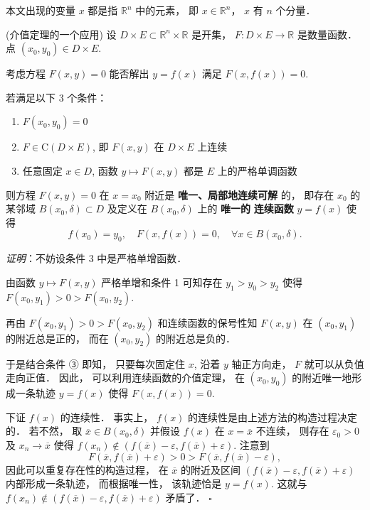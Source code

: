 

本文出现的变量 $x$ 都是指 $\mathbb{R}^n$ 中的元素， 即 $x\in\mathbb{R}^n$， $x$ 有 $n$ 个分量．

\begin{theorem}{(介值定理的一个应用)}\label{impli_the1}
设 $D\times E\subset\mathbb{R}^{n}\times\mathbb{R}$ 是开集，
$F:D\times E\rightarrow\mathbb{R}$ 是数量函数． 点 $(x_{0},y_{0})\in D\times E.$ 

考虑方程 $F(x,y)=0$ 能否解出 $y=f(x)$ 满足 $F(x,f(x))=0.$ 

若满足以下 3 个条件：

\begin{enumerate}
\item $F(x_{0},y_{0})=0$
\item $F\in\mathrm{C}(D\times E)$, 即 $F(x,y)$ 在 $D\times E$ 上连续
\item 任意固定 $x\in D$, 函数 $y\mapsto F(x,y)$ 都是 $E$ 上的严格单调函数
\end{enumerate}

则方程 $F(x,y)=0$ 在 $x=x_{0}$ 附近是\textbf{ 唯一、局部地连续可解} 的， 即存在 $x_{0}$
的某邻域 $B(x_{0},\delta)\subset D$ 及定义在 $B(x_{0},\delta)$ 上的 \textbf{唯一的}\textbf{
连续函数} $y=f(x)$ 使得
\[
f(x_{0})=y_{0},\quad F(x,f(x))=0,\quad\forall x\in B(x_{0},\delta).
\]
\end{theorem}

\textsl{证明}：不妨设条件 3 中是严格单增函数． 

由函数 $y\mapsto F(x,y)$ 严格单增和条件 1 可知存在 $y_{1}>y_{0}>y_{2}$ 使得 $F(x_{0},y_{1})>0>F(x_{0},y_{2})$. 

再由 $F(x_{0},y_{1})>0>F(x_{0},y_{2})$ 和连续函数的保号性知 $F(x,y)$ 在 $(x_{0},y_{1})$
的附近总是正的， 而在 $(x_{0},y_{2})$ 的附近总是负的． 

于是结合条件 ③ 即知， 只要每次固定住 $x$, 沿着 $y$ 轴正方向走， $F$ 就可以从负值走向正值． 因此， 可以利用连续函数的介值定理，
在 $(x_{0},y_{0})$ 的附近唯一地形成一条轨迹 $y=f(x)$ 使得 $F(x,f(x))=0$. 

下证 $f(x)$ 的连续性． 事实上， $f(x)$ 的连续性是由上述方法的构造过程决定的． 若不然， 取 $\overline{x}\in B(x_0,\delta)$ 并假设 $f(x)$ 在
$x=\overline{x}$ 不连续， 则存在 $\varepsilon_{0}>0$ 及 $x_{n}\rightarrow\overline{x}$
使得 $f(x_{n})\notin(f(\overline{x})-\varepsilon,f(\overline{x})+\varepsilon)$.
注意到
\[
F(\overline{x},f(\overline{x})+\varepsilon)>0>F(\overline{x},f(\overline{x})-\varepsilon),
\]
因此可以重复存在性的构造过程， 在 \textbf{$\overline{x}$ }的附近及区间 $(f(\overline{x})-\varepsilon,f(\overline{x})+\varepsilon)$
内部形成一条轨迹， 而根据唯一性， 该轨迹恰是 $y=f(x)$. 这就与 $f(x_{n})\notin(f(\overline{x})-\varepsilon,f(\overline{x})+\varepsilon)$
矛盾了． $\square$ 


